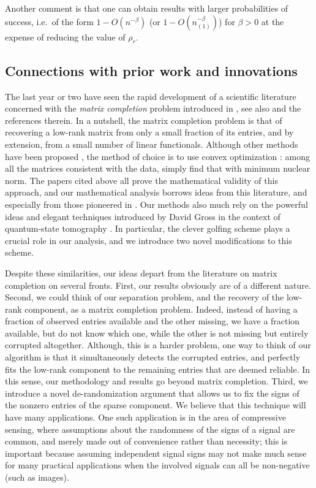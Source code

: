 Another comment is that one can obtain results with larger probabilities of success, i.e.~of the form $1 - O(n^{-\beta})$ (or $1 - O(n_{(1)}^{-\beta})$) for $\beta > 0$ at the expense of reducing the value of $\rho_r$.

\subsection{Connections with prior work and innovations}
\label{sec:connections}

The last year or two have seen the rapid development of a scientific literature concerned with the {\em matrix completion} problem introduced in \cite{CR08}, see also \cite{CT09,Candes2009-PIEEE,Montanari-IT,GrossQuantum,GrossMC} and the references therein. In a nutshell, the matrix completion problem is that of recovering a low-rank matrix from only a small fraction of its entries, and by extension, from a small number of linear functionals. Although other methods have been proposed \cite{Montanari-IT}, the method of choice is to use convex optimization \cite{CT09,Candes2009-PIEEE,GrossQuantum,GrossMC,Recht2008-SR}: among all the matrices consistent with the data, simply find that with minimum nuclear norm. The papers cited above all prove the mathematical validity of this approach, and our mathematical analysis borrows ideas from this literature, and especially from those pioneered in \cite{CR08}. Our methods also much rely on the powerful ideas and elegant techniques introduced by David Gross in the context of quantum-state tomography \cite{GrossQuantum,GrossMC}. In particular, the clever golfing scheme \cite{GrossMC} plays a crucial role in our analysis, and we introduce two novel modifications to this scheme.

Despite these similarities, our ideas depart from the literature on matrix completion on several fronts. First, our results obviously are of a different nature.  Second, we could think of our separation problem, and the recovery of the low-rank component, as a matrix completion problem. Indeed, instead of having a fraction of observed entries available and the other missing, we have a fraction available, but do not know which one, while the other is not missing but entirely corrupted altogether. Although, this is a harder problem, one way to think of our algorithm is that it simultaneously detects the corrupted entries, and perfectly fits the low-rank component to the remaining entries that are deemed reliable. In this sense, our methodology and results go beyond matrix completion.  Third, we introduce a novel de-randomization argument that allows us to fix the signs of the nonzero entries of the sparse component. We believe that this technique will have many applications. One such application is in the area of compressive sensing, where assumptions about the randomness of the signs of a signal are common, and merely made out of convenience rather than necessity; this is important because assuming independent signal signs may not make much sense for many practical applications when the involved signals can all be non-negative (such as images).

